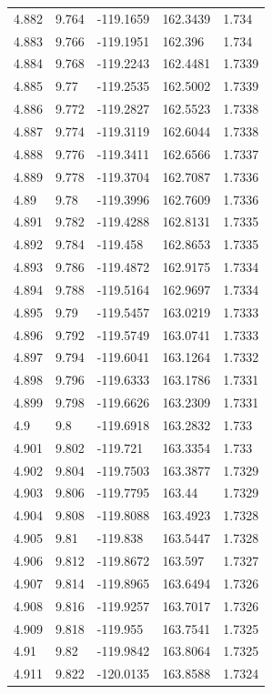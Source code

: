\begin{tabular}{lllll}
4.882 & 9.764 & -119.1659 & 162.3439 & 1.734 \\
4.883 & 9.766 & -119.1951 & 162.396 & 1.734 \\
4.884 & 9.768 & -119.2243 & 162.4481 & 1.7339 \\
4.885 & 9.77 & -119.2535 & 162.5002 & 1.7339 \\
4.886 & 9.772 & -119.2827 & 162.5523 & 1.7338 \\
4.887 & 9.774 & -119.3119 & 162.6044 & 1.7338 \\
4.888 & 9.776 & -119.3411 & 162.6566 & 1.7337 \\
4.889 & 9.778 & -119.3704 & 162.7087 & 1.7336 \\
4.89 & 9.78 & -119.3996 & 162.7609 & 1.7336 \\
4.891 & 9.782 & -119.4288 & 162.8131 & 1.7335 \\
4.892 & 9.784 & -119.458 & 162.8653 & 1.7335 \\
4.893 & 9.786 & -119.4872 & 162.9175 & 1.7334 \\
4.894 & 9.788 & -119.5164 & 162.9697 & 1.7334 \\
4.895 & 9.79 & -119.5457 & 163.0219 & 1.7333 \\
4.896 & 9.792 & -119.5749 & 163.0741 & 1.7333 \\
4.897 & 9.794 & -119.6041 & 163.1264 & 1.7332 \\
4.898 & 9.796 & -119.6333 & 163.1786 & 1.7331 \\
4.899 & 9.798 & -119.6626 & 163.2309 & 1.7331 \\
4.9 & 9.8 & -119.6918 & 163.2832 & 1.733 \\
4.901 & 9.802 & -119.721 & 163.3354 & 1.733 \\
4.902 & 9.804 & -119.7503 & 163.3877 & 1.7329 \\
4.903 & 9.806 & -119.7795 & 163.44 & 1.7329 \\
4.904 & 9.808 & -119.8088 & 163.4923 & 1.7328 \\
4.905 & 9.81 & -119.838 & 163.5447 & 1.7328 \\
4.906 & 9.812 & -119.8672 & 163.597 & 1.7327 \\
4.907 & 9.814 & -119.8965 & 163.6494 & 1.7326 \\
4.908 & 9.816 & -119.9257 & 163.7017 & 1.7326 \\
4.909 & 9.818 & -119.955 & 163.7541 & 1.7325 \\
4.91 & 9.82 & -119.9842 & 163.8064 & 1.7325 \\
4.911 & 9.822 & -120.0135 & 163.8588 & 1.7324 \\

\end{tabular}
